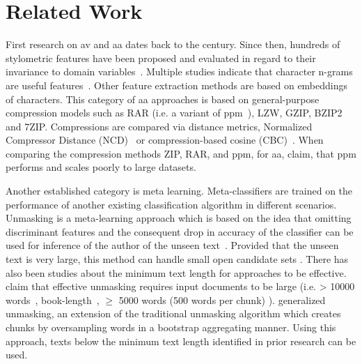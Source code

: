 \label{chap:related_work}
\chapter{Related Work}



First research on \ac{av} and \ac{aa} dates back to the  century.
Since then, hundreds of stylometric features have been proposed and evaluated in regard to their invariance to domain variables~\citep{stamatatos_survey_2009,barlas_cross_domain_2020}.
Multiple studies indicate that character n-grams are useful features~\citep{tyo_state_2022,altakrori_topic_2021}. 
Other feature extraction methods are based on embeddings of characters.
This category of \ac{aa} approaches is based on general-purpose compression models such as RAR (i.e. a variant of \ac{ppm}~\citep{tyo_state_2022}), LZW, GZIP, BZIP2 and 7ZIP.
Compressions are compared via distance metrics, Normalized Compressor Distance (NCD)~\citep{elmanarelbouanani_authorship_2014} or compression-based cosine (CBC)~\citep{bevendorff_divergence_based_2020,bevendorff_overview_2024}.
When comparing the compression methods ZIP, RAR, and \ac{ppm}, for \ac{aa}, \citet{tyo_state_2022} claim, that \ac{ppm} performs and scales poorly to large datasets.


Another established \ai{} category is meta learning.
Meta-classifiers are trained on the performance of another existing classification algorithm in different scenarios.
Unmasking is a meta-learning approach which is based on the idea that omitting discriminant features and the consequent drop in accuracy of the classifier can be used for inference of the author of the unseen text~\citep{koppel_authorship_2004}.
Provided that the unseen text is very large, this method can handle small open candidate sets \citep{koppel_authorship_2011}.
There has also been studies about the minimum text length for approaches to be effective. 
\citet{koppel_determining_2014,bevendorff_generalizing_2019} claim that effective unmasking requires input documents to be large (i.e. > 10000 words~\citep{koppel_determining_2014}, book-length~\citep{bevendorff_generalizing_2019}, $\geq$ 5000 words (500 words per chunk) \citep{bevendorff_divergence_based_2020}).
\citet{bevendorff_generalizing_2019,bevendorff_divergence_based_2020} generalized unmasking, an extension of the traditional unmasking algorithm which creates chunks by oversampling words in a bootstrap aggregating manner. 
Using this approach, texts below the minimum text length identified in prior research can be used.


